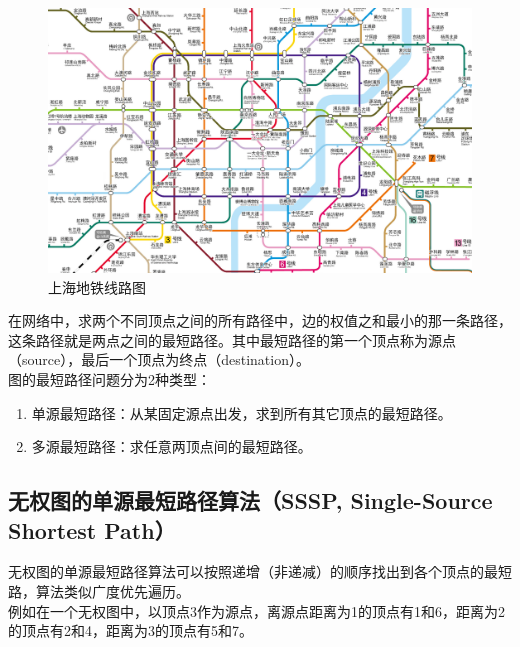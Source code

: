 \begin{figure}[H]
	\centering
	\includegraphics[scale=0.3]{img/C10/10-5/1.png}
	\caption{上海地铁线路图}
\end{figure}

在网络中，求两个不同顶点之间的所有路径中，边的权值之和最小的那一条路径，这条路径就是两点之间的最短路径。其中最短路径的第一个顶点称为源点（source），最后一个顶点为终点（destination）。\\

图的最短路径问题分为2种类型：

\begin{enumerate}
	\item 单源最短路径：从某固定源点出发，求到所有其它顶点的最短路径。
	\item 多源最短路径：求任意两顶点间的最短路径。
\end{enumerate}

\vspace{0.5cm}

\subsection{无权图的单源最短路径算法（SSSP, Single-Source Shortest Path）}

无权图的单源最短路径算法可以按照递增（非递减）的顺序找出到各个顶点的最短路，算法类似广度优先遍历。\\

例如在一个无权图中，以顶点3作为源点，离源点距离为1的顶点有1和6，距离为2的顶点有2和4，距离为3的顶点有5和7。

